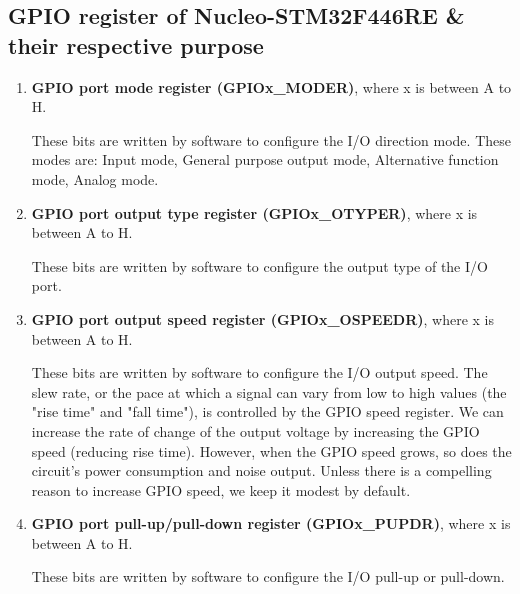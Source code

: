 \documentclass[footheight=20pt, footsepline, headheight=20pt, headsepline]{scrartcl}
\begin{document}
\subsection*{GPIO register of Nucleo-STM32F446RE \& their respective purpose}
\begin{enumerate}
    \item \textbf{GPIO port mode register (GPIOx\_MODER)}, where x is between A to H.
    \par These bits are written by software to configure the I/O direction mode. These modes are: Input mode, General purpose output mode, Alternative function mode, Analog mode.
    \item \textbf{GPIO port output type register (GPIOx\_OTYPER)}, where x is between A to H.
    \par These bits are written by software to configure the output type of the I/O port.
    \item \textbf{GPIO port output speed register (GPIOx\_OSPEEDR)}, where x is between A to H.
    \par These bits are written by software to configure the I/O output speed. The slew rate, or the pace at which a signal can vary from low to high values (the "rise time" and "fall time"), is controlled by the GPIO speed register. We can increase the rate of change of the output voltage by increasing the GPIO speed (reducing rise time). However, when the GPIO speed grows, so does the circuit's power consumption and noise output. Unless there is a compelling reason to increase GPIO speed, we keep it modest by default.
    \item \textbf{GPIO port pull-up/pull-down register (GPIOx\_PUPDR)}, where x is between A to H.
    \par These bits are written by software to configure the I/O pull-up or pull-down.
    

\end{enumerate}
\end{document}
